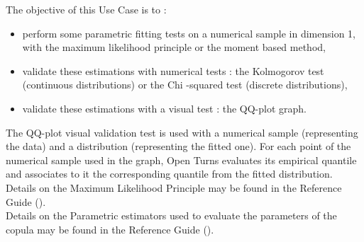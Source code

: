 \renewcommand{\filename}{docUC_InputWithData_FittingTests.tex}
\renewcommand{\filetitle}{UC : Distribution fitting tests, numerical and visual validation tests : Chi-squared test, Kolmogorov test, QQ-plot graph}

\HeaderIIILevel






The objective of this Use Case is to :
\begin{itemize}
\item perform some parametric fitting tests on a numerical sample in dimension 1, with the maximum likelihood principle or the moment based method,
\item validate these estimations with numerical tests : the Kolmogorov test (continuous distributions) or the Chi -squared test (discrete distributions),
\item validate these estimations with a visual test : the QQ-plot graph.
\end{itemize}

The QQ-plot visual validation test is used with a numerical sample (representing the data) and a distribution (representing the fitted one). For each point of the numerical sample used in the graph, Open Turns evaluates its empirical quantile and associates to it the corresponding quantile from the fitted distribution. \\

Details on the Maximum Likelihood  Principle may be found in the Reference Guide ().\\

Details on the Parametric estimators used to evaluate the parameters of the copula may be found in the Reference Guide ().\\

